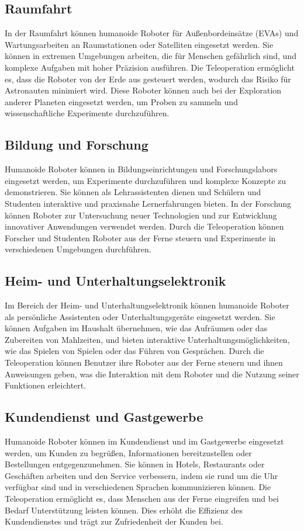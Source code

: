 \subsection{Raumfahrt}
In der Raumfahrt können humanoide Roboter für Außenbordeinsätze (EVAs) und Wartungsarbeiten an Raumstationen oder Satelliten eingesetzt werden. Sie können in extremen Umgebungen arbeiten, die für Menschen gefährlich sind, und komplexe Aufgaben mit hoher Präzision ausführen. Die Teleoperation ermöglicht es, dass die Roboter von der Erde aus gesteuert werden, wodurch das Risiko für Astronauten minimiert wird. Diese Roboter können auch bei der Exploration anderer Planeten eingesetzt werden, um Proben zu sammeln und wissenschaftliche Experimente durchzuführen.

\subsection{Bildung und Forschung}
Humanoide Roboter können in Bildungseinrichtungen und Forschungslabors eingesetzt werden, um Experimente durchzuführen und komplexe Konzepte zu demonstrieren. Sie können als Lehrassistenten dienen und Schülern und Studenten interaktive und praxisnahe Lernerfahrungen bieten. In der Forschung können Roboter zur Untersuchung neuer Technologien und zur Entwicklung innovativer Anwendungen verwendet werden. Durch die Teleoperation können Forscher und Studenten Roboter aus der Ferne steuern und Experimente in verschiedenen Umgebungen durchführen.

\subsection{Heim- und Unterhaltungselektronik}
Im Bereich der Heim- und Unterhaltungselektronik können humanoide Roboter als persönliche Assistenten oder Unterhaltungsgeräte eingesetzt werden. Sie können Aufgaben im Haushalt übernehmen, wie das Aufräumen oder das Zubereiten von Mahlzeiten, und bieten interaktive Unterhaltungsmöglichkeiten, wie das Spielen von Spielen oder das Führen von Gesprächen. Durch die Teleoperation können Benutzer ihre Roboter aus der Ferne steuern und ihnen Anweisungen geben, was die Interaktion mit dem Roboter und die Nutzung seiner Funktionen erleichtert.

\subsection{Kundendienst und Gastgewerbe}
Humanoide Roboter können im Kundendienst und im Gastgewerbe eingesetzt werden, um Kunden zu begrüßen, Informationen bereitzustellen oder Bestellungen entgegenzunehmen. Sie können in Hotels, Restaurants oder Geschäften arbeiten und den Service verbessern, indem sie rund um die Uhr verfügbar sind und in verschiedenen Sprachen kommunizieren können. Die Teleoperation ermöglicht es, dass Menschen aus der Ferne eingreifen und bei Bedarf Unterstützung leisten können. Dies erhöht die Effizienz des Kundendienstes und trägt zur Zufriedenheit der Kunden bei.
\\

